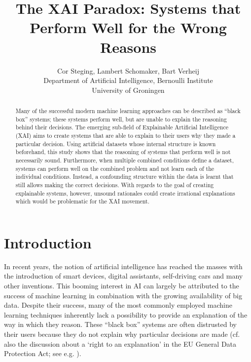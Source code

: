 \documentclass[letterpaper]{article} %
\begin{document}
%
\title{The XAI Paradox: Systems that Perform Well for the Wrong Reasons}
\author{Cor Steging, Lambert Schomaker, Bart Verheij\\
Department of Artificial Intelligence, Bernoulli Institute\\
University of Groningen\\
}
\maketitle
\begin{abstract}
Many of the successful modern machine learning approaches can be described as ``black box'' systems; these systems perform well, but are unable to explain the reasoning behind their decisions. The emerging sub-field of Explainable Artificial Intelligence (XAI) aims to create systems that are able to explain to their users why they made a particular decision. Using artificial datasets whose internal structure is known beforehand, this study shows that the reasoning of systems that perform well is not necessarily sound. Furthermore, when multiple combined conditions define a dataset, systems can perform well on the combined problem and not learn each of the individual conditions. Instead, a confounding structure within the data is learnt that still allows making the correct decisions. With regards to the goal of creating explainable systems, however, unsound rationales could create irrational explanations which would be problematic for the XAI movement.
\end{abstract}

\section{Introduction}
In recent years, the notion of artificial intelligence has reached the masses with the introduction of smart devices, digital assistants, self-driving cars and many other inventions. This booming interest in AI can largely be attributed to the success of machine learning in combination with the growing availability of big data. Despite their success, many of the most commonly employed machine learning techniques inherently lack a possibility to provide an explanation of the way in which they reason. These ``black box'' systems are often distrusted by their users because they do not explain why particular decisions are made (cf. also the discussion about a `right to an explanation' in the EU General Data Protection Act; see e.g. \cite{edwards2017slave}).
\end{document}
